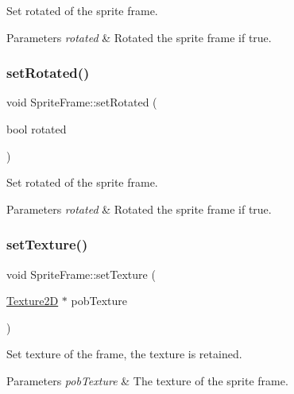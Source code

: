 Set rotated of the sprite frame.


\begin{DoxyParams}{Parameters}
{\em rotated} & Rotated the sprite frame if true. \\
\hline
\end{DoxyParams}
\mbox{\label{classSpriteFrame_ac047765c8364710cf04c99e9b723c84c}} 
\subsubsection{\texorpdfstring{set\+Rotated()}{setRotated()}\hspace{0.1cm}{\footnotesize\ttfamily [2/2]}}
{\footnotesize\ttfamily void Sprite\+Frame\+::set\+Rotated (\begin{DoxyParamCaption}\item[{bool}]{rotated }\end{DoxyParamCaption})\hspace{0.3cm}{\ttfamily [inline]}}

Set rotated of the sprite frame.


\begin{DoxyParams}{Parameters}
{\em rotated} & Rotated the sprite frame if true. \\
\hline
\end{DoxyParams}
\mbox{\label{classSpriteFrame_ae4908b4831f92cad38ff57af56c396e0}} 
\subsubsection{\texorpdfstring{set\+Texture()}{setTexture()}\hspace{0.1cm}{\footnotesize\ttfamily [1/2]}}
{\footnotesize\ttfamily void Sprite\+Frame\+::set\+Texture (\begin{DoxyParamCaption}\item[{\hyperlink{classTexture2D}{Texture2D} $\ast$}]{pob\+Texture }\end{DoxyParamCaption})}

Set texture of the frame, the texture is retained.


\begin{DoxyParams}{Parameters}
{\em pob\+Texture} & The texture of the sprite frame. \\
\hline
\end{DoxyParams}
\mbox{\label{classSpriteFrame_ae4908b4831f92cad38ff57af56c396e0}} 
